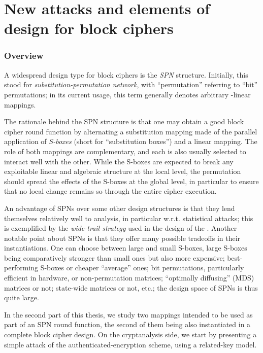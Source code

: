 \part[Nouvelles attaques et constructions pour chiffres par bloc]
	{New attacks and elements of design for block ciphers}
\label{part:constructions}

\pagestyle{plain}
\section*{Overview}

A widespread design type for block ciphers is the \emph{SPN} structure. Initially, this stood for \emph{substitution-permutation network},
with ``permutation'' referring to ``bit'' permutations; in its current usage, this term generally denotes arbitrary \ftwo-linear
mappings.

The rationale behind the SPN structure is that one may obtain a good block cipher round function by alternating a substitution
mapping made of the parallel application of \emph{S-boxes} (short for ``substitution boxes'') and a linear mapping. The role
of both mappings are complementary, and each is also usually selected to interact well with the other. While the S-boxes
are expected to break any exploitable linear and algebraic structure at the local level, the permutation
should spread the effects of the S-boxes at the global level, in particular to ensure that no local change remains so through
the entire cipher execution.

An advantage of SPNs over some other design structures is that they lend themselves relatively well to analysis, in particular w.r.t.
statistical attacks; this is exemplified by the \emph{wide-trail strategy} used in the design of the \aes. Another notable point
about SPNs is that they offer many possible tradeoffs in their instantiations. One can choose between large and small S-boxes,
large S-boxes being comparatively stronger than small ones but also more expensive; best-performing S-boxes or cheaper
``average'' ones; bit permutations, particularly efficient in hardware, or non-permutation matrices; ``optimally diffusing'' (MDS)
matrices or not; state-wide matrices or not, etc.; the design space of SPNs is thus quite large.

\bigskip

In the second part of this thesis, we study two mappings intended to be used as part of an SPN round function, the second
of them being also instantiated in a complete block cipher design. On the cryptanalysis side, we start by presenting a simple attack of the
\proestotr authenticated-encryption scheme, using a related-key model.

